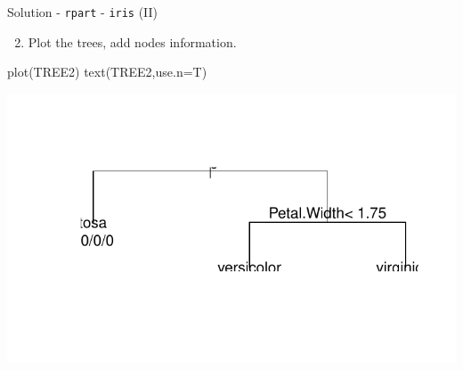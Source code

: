 \documentclass[
  10pt,
  ignorenonframetext,
]{beamer}
\newenvironment{Shaded}{}{}
\newcommand{\DataTypeTok}[1]{#1}
\newcommand{\KeywordTok}[1]{\textcolor[rgb]{0.00,0.00,1.00}{#1}}
\newcommand{\NormalTok}[1]{#1}
\providecommand{\tightlist}{%
  \setlength{\itemsep}{0pt}\setlength{\parskip}{0pt}}
\begin{document}
\begin{frame}[fragile]{Solution - \texttt{rpart} - \texttt{iris} (II)}
\protect\hypertarget{solution---rpart---iris-ii}{}

\begin{enumerate}
[1)]
\setcounter{enumi}{1}
\tightlist
\item
  Plot the trees, add nodes information.
\end{enumerate}

\begin{Shaded}
\begin{Highlighting}[]
\KeywordTok{plot}\NormalTok{(TREE2)}
\KeywordTok{text}\NormalTok{(TREE2,}\DataTypeTok{use.n=}\NormalTok{T)}
\end{Highlighting}
\end{Shaded}

\includegraphics{ml_exercises_c1_treesbagging_files/figure-beamer/unnamed-chunk-8-1.pdf}

\end{frame}
\end{document}
